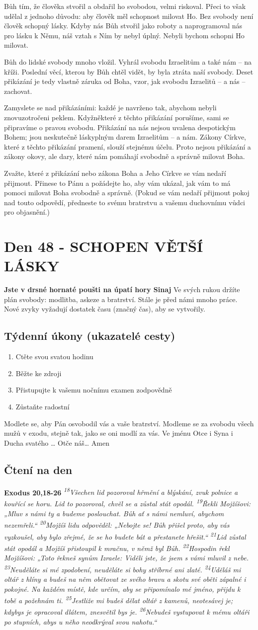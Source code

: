 \documentclass[11pt]{article}
\newcommand{\zacatekSedmyTyden}{
  \textbf{Jste v drsné hornaté poušti na úpatí hory Sinaj} \newline 
  Ve svých rukou držíte plán svobody: modlitba, askeze a bratrství. Stále je před námi mnoho práce. Nové zvyky vyžadují dostatek času (značný čas), aby se vytvořily.

  \subsection*{Týdenní úkony (ukazatelé cesty)}
\begin{enumerate}
  \item Ctěte svou svatou hodinu
  \item Běžte ke zdroji
  \item Přistupujte k vašemu nočnímu examen zodpovědně
  \item Zůstaňte radostní
\end{enumerate}
Modlete se, aby Pán osvobodil vás a vaše bratrství. \newline
Modleme se za svobodu všech mužů v exodu, stejně tak, jako se oni modlí za vás.\newline
Ve jménu Otce i Syna i Ducha svatého …  Otče náš… Amen
}
\begin{document}
Bůh tím, že člověka stvořil a obdařil ho svobodou, velmi riskoval. Přeci to však udělal z jednoho důvodu: aby
člověk měl schopnost milovat Ho. Bez svobody není člověk schopný lásky. Kdyby nás Bůh stvořil jako roboty
a naprogramoval nás pro lásku k Němu, náš vztah s Ním by nebyl úplný. Nebyli bychom schopni Ho milovat.

Bůh do lidské svobody mnoho vložil. Vyhrál svobodu Izraelitům a také nám – na kříži. Poslední věcí, kterou
by Bůh chtěl vidět, by byla ztráta naší svobody. Deset přikázání je tedy vlastně záruka od Boha, vzor, jak
svobodu Izraelitů – a nás – zachovat.

Zamyslete se nad přikázáními: každé je navrženo tak, abychom nebyli znovuzotročeni peklem. Kdyžněkteré
z těchto přikázání porušíme, sami se připravíme o pravou svobodu. Přikázání na nás nejsou uvalena
despotickým Bohem; jsou neskutečně láskyplným darem Izraelitům – a nám. Zákony Církve, které z těchto
přikázání pramení, slouží stejnému účelu. Proto nejsou přikázání a zákony okovy, ale dary, které nám pomáhají
svobodně a správně milovat Boha.

Zvažte, které z přikázání nebo zákona Boha a Jeho Církve se vám nedaří přijmout. Přinese to Pánu a požádejte
ho, aby vám ukázal, jak vám to má pomoci milovat Boha svobodně a správně. (Pokud se vám nedaří přijmout
pokoj nad touto odpovědí, předneste to svému bratrstvu a vašemu duchovnímu vůdci pro objasnění.)


\newpage
\section{Den 48 - SCHOPEN VĚTŠÍ LÁSKY }
\zacatekSedmyTyden
\subsection*{Čtení na den}
\textbf{Exodus 20,18-26}
\newline
\textit{
\textsuperscript{18}Všechen lid pozoroval hřmění a blýskání, zvuk polnice a kouřící se horu. Lid to pozoroval, chvěl se a zůstal stát opodál.
\textsuperscript{19}Řekli Mojžíšovi: „Mluv s námi ty a budeme poslouchat. Bůh ať s námi nemluví, abychom nezemřeli.“
\textsuperscript{20}Mojžíš lidu odpověděl: „Nebojte se! Bůh přišel proto, aby vás vyzkoušel, aby bylo zřejmé, že se ho budete bát a přestanete hřešit.“
\textsuperscript{21}Lid zůstal stát opodál a Mojžíš přistoupil k mračnu, v němž byl Bůh.
\textsuperscript{22}Hospodin řekl Mojžíšovi: „Toto řekneš synům Izraele: Viděli jste, že jsem s vámi mluvil z nebe.
\textsuperscript{23}Neuděláte si mé zpodobení, neuděláte si bohy stříbrné ani zlaté.
\textsuperscript{24}Uděláš mi oltář z hlíny a budeš na něm obětovat ze svého bravu a skotu své oběti zápalné i pokojné. Na každém místě, kde určím, aby se připomínalo mé jméno, přijdu k tobě a požehnám ti.
\textsuperscript{25}Jestliže mi budeš dělat oltář z kamenů, neotesávej je; kdybys je opracoval dlátem, znesvětil bys je.
\textsuperscript{26}Nebudeš vystupovat k mému oltáři po stupních, abys u něho neodkrýval svou nahotu.“
}
\end{document}
